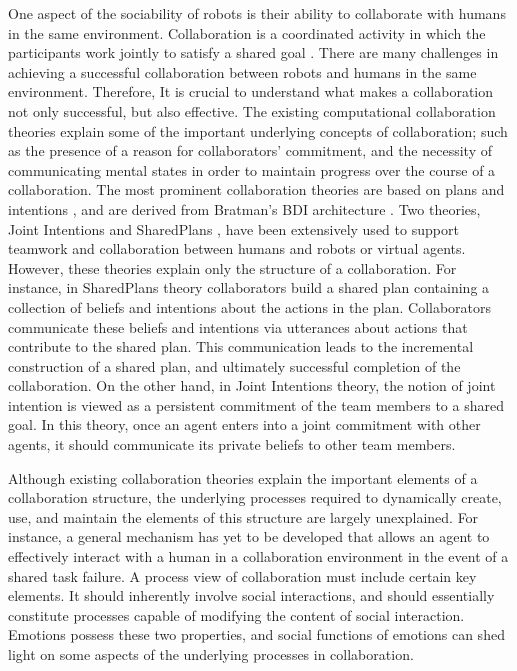 One aspect of the sociability of robots is their ability to collaborate with
humans in the same environment. Collaboration is a coordinated activity in which
the participants work jointly to satisfy a shared goal
\cite{grosz:plans-discourse}. There are many challenges in achieving a
successful collaboration between robots and humans in the same environment.
Therefore, It is crucial to understand what makes a collaboration not only
successful, but also effective. The existing computational collaboration
theories explain some of the important underlying concepts of collaboration;
such as the presence of a reason for collaborators' commitment, and the necessity
of communicating mental states in order to maintain progress over the course of
a collaboration. The most prominent collaboration theories are based on plans
and intentions \cite{cohen:teamwork} \cite{grosz:plans-discourse}
\cite{Litman:discourse-commonsense}, and are derived from Bratman's BDI
architecture \cite{bratman:intentions-plans}. Two theories, Joint Intentions
\cite{cohen:teamwork} and SharedPlans
\cite{grosz:planning-acting,grosz:collaboration,grosz:plans-discourse}, have
been extensively used to support teamwork and collaboration between humans and
robots or virtual agents. However, these theories explain only the structure of
a collaboration. For instance, in SharedPlans theory collaborators build a
shared plan containing a collection of beliefs and intentions about the actions
in the plan. Collaborators communicate these beliefs and intentions via
utterances about actions that contribute to the shared plan. This communication
leads to the incremental construction of a shared plan, and ultimately
successful completion of the collaboration. On the other hand, in Joint
Intentions theory, the notion of joint intention is viewed as a persistent
commitment of the team members to a shared goal. In this theory, once an agent
enters into a joint commitment with other agents, it should communicate its
private beliefs to other team members.

Although existing collaboration theories explain the important elements of a
collaboration structure, the underlying processes required to dynamically
create, use, and maintain the elements of this structure are largely
unexplained. For instance, a general mechanism has yet to be developed that
allows an agent to effectively interact with a human in a collaboration
environment in the event of a shared task failure. A process view of
collaboration must include certain key elements. It should inherently involve
social interactions, and should essentially constitute processes capable of
modifying the content of social interaction. Emotions possess these
two properties, and social functions of emotions can shed light on some aspects
of the underlying processes in collaboration.

